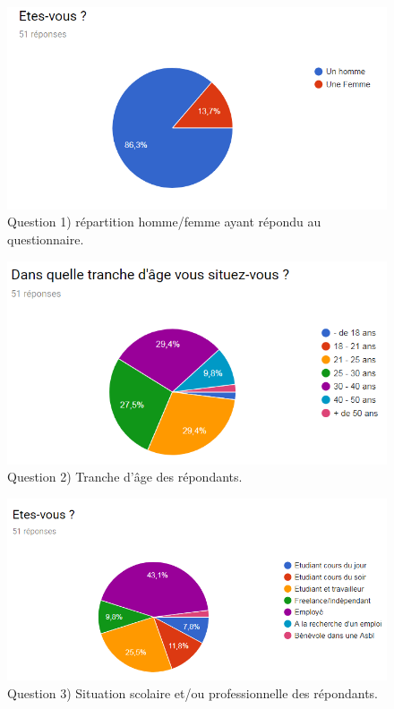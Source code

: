 \documentclass[a4paper,fleqn,12pt,oneside]{report}
\begin{document}
\begin{figure}[!ht]
\centering
\includegraphics[scale=1]{figures/QHF.png}
\caption{Question 1) répartition homme/femme ayant répondu au questionnaire.}
\label{fig:QHF}
\end{figure}

\begin{figure}[!ht]
\centering
\includegraphics[scale=1]{figures/QAge.png}
\caption{Question 2) Tranche d'âge des répondants.}
\label{fig:QAge}
\end{figure}

\newpage
{}

\begin{figure}[!ht]
\centering
\includegraphics[scale=1]{figures/QStatus.png}
\caption{Question 3) Situation scolaire et/ou professionnelle des répondants.}
\label{fig:QStatus}
\end{figure}
\end{document}
